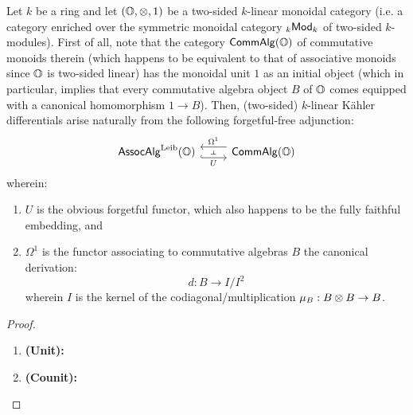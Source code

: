                 \begin{theorem} \label{theorem: kahler_differential_universal_property}
                    Let $k$ be a ring and let $(\O, \tensor, 1)$ be a two-sided $k$-linear monoidal category (i.e. a category enriched over the symmetric monoidal category ${}_k\mathsf{Mod}_k$ of two-sided $k$-modules). First of all, note that the category $\mathsf{Comm}\mathsf{Alg}(\mathbb{O})$ of commutative monoids therein (which happens to be equivalent to that of associative monoids since $\mathbb{O}$ is two-sided linear) has the monoidal unit $1$ as an initial object (which in particular, implies that every commutative algebra object $B$ of $\mathbb{O}$ comes equipped with a canonical homomorphism $1 \to B$). Then, (two-sided) $k$-linear K\"ahler differentials arise naturally from the following forgetful-free adjunction:
                        $$
                            \begin{tikzcd}
                            	{\Assoc\Alg^{\Leib}(\O)} & {\Comm\Alg(\O)}
                            	\arrow[""{name=0, anchor=center, inner sep=0}, "U"', shift right=2, hook, from=1-1, to=1-2]
                            	\arrow[""{name=1, anchor=center, inner sep=0}, "{\Omega^1}"', shift right=2, from=1-2, to=1-1]
                            	\arrow["\dashv"{anchor=center, rotate=-90}, draw=none, from=1, to=0]
                            \end{tikzcd}
                        $$
                    wherein:
                        \begin{enumerate}
                            \item $U$ is the obvious forgetful functor, which also happens to be the fully faithful embedding, and
                            \item $\Omega^1$ is the functor associating to commutative algebras $B$ the canonical derivation:
                                $$d: B \to I/I^2$$
                            wherein $I$ is the kernel of the codiagonal/multiplication $\mu_B: B \tensor B \to B$. 
                        \end{enumerate}
                \end{theorem}
                    \begin{proof}
                        \noindent
                        \begin{enumerate}
                            \item \textbf{(Unit):} 
                            \item \textbf{(Counit):} 
                        \end{enumerate}
                    \end{proof}
